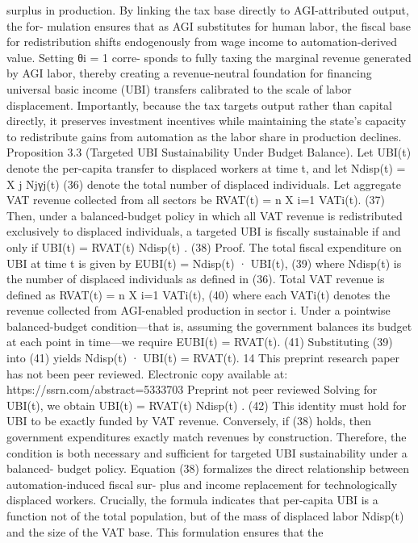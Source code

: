 surplus in production. By linking the tax base directly to AGI-attributed output, the for-
mulation ensures that as AGI substitutes for human labor, the fiscal base for redistribution
shifts endogenously from wage income to automation-derived value. Setting θi = 1 corre-
sponds to fully taxing the marginal revenue generated by AGI labor, thereby creating a
revenue-neutral foundation for financing universal basic income (UBI) transfers calibrated
to the scale of labor displacement. Importantly, because the tax targets output rather than
capital directly, it preserves investment incentives while maintaining the state’s capacity to
redistribute gains from automation as the labor share in production declines.
Proposition 3.3 (Targeted UBI Sustainability Under Budget Balance). Let UBI(t) denote
the per-capita transfer to displaced workers at time t, and let
Ndisp(t) =
X
j
Njγj(t)
(36)
denote the total number of displaced individuals. Let aggregate VAT revenue collected from
all sectors be
RVAT(t) =
n
X
i=1
VATi(t).
(37)
Then, under a balanced-budget policy in which all VAT revenue is redistributed exclusively
to displaced individuals, a targeted UBI is fiscally sustainable if and only if
UBI(t) = RVAT(t)
Ndisp(t) .
(38)
Proof. The total fiscal expenditure on UBI at time t is given by
EUBI(t) = Ndisp(t) · UBI(t),
(39)
where Ndisp(t) is the number of displaced individuals as defined in (36). Total VAT revenue
is defined as
RVAT(t) =
n
X
i=1
VATi(t),
(40)
where each VATi(t) denotes the revenue collected from AGI-enabled production in sector i.
Under a pointwise balanced-budget condition—that is, assuming the government balances
its budget at each point in time—we require
EUBI(t) = RVAT(t).
(41)
Substituting (39) into (41) yields
Ndisp(t) · UBI(t) = RVAT(t).
14
This preprint research paper has not been peer reviewed. Electronic copy available at: https://ssrn.com/abstract=5333703
Preprint not peer reviewed
Solving for UBI(t), we obtain
UBI(t) = RVAT(t)
Ndisp(t) .
(42)
This identity must hold for UBI to be exactly funded by VAT revenue. Conversely, if (38)
holds, then government expenditures exactly match revenues by construction. Therefore, the
condition is both necessary and sufficient for targeted UBI sustainability under a balanced-
budget policy.
Equation (38) formalizes the direct relationship between automation-induced fiscal sur-
plus and income replacement for technologically displaced workers. Crucially, the formula
indicates that per-capita UBI is a function not of the total population, but of the mass of
displaced labor Ndisp(t) and the size of the VAT base. This formulation ensures that the
